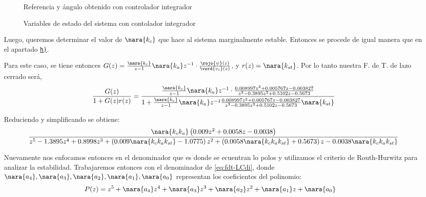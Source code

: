 \begin{figure}[h]
    \centering
    
    \caption{Referencia y ángulo obtenido con controlador integrador}\label{fig:psi-int-disc}
\end{figure}

\begin{figure}[h]
  \centering
  
  \caption{Variables de estado del sistema con contolador integrador}\label{fig:estado-int-disc}
\end{figure}

\FloatBarrier

Luego, queremos determinar el valor de $\nara{k_{c}}$ que hace al sistema
marginalmente estable. Entonces se procede de igual manera que en el apartado
\hyperref[pregunta-h]{\texttt{h)}}.

Para este caso, se tiene entonces
$G(z) = \frac{\nara{k_{c}}}{z-1}\nara{k_{a}} z^{-1} \cdot \frac{\rojo{\psi}(z)}{\verd{v_i}(z)}$,
y $r(z) = \nara{k_{st}}$. Por lo tanto nuestra F. de T. de lazo cerrado será,
\begin{equation}
    \frac{G(z)}{1 + G(z)r(z)} = \dfrac{\frac{\nara{k_{c}}}{z-1}\nara{k_a} z^{-1} \cdot\frac{0.008997z^2 + 0.005767 z - 0.003827}
    {z^3 - 0.3895 z^2 + 0.5102 z -0.5673}}
    {1+\frac{\nara{k_{c}}}{z-1}\nara{k_a} z^{-1} \frac{0.008997z^2 + 0.005767 z - 0.003827}
    {z^3 - 0.3895 z^2 + 0.5102 z -0.5673}\nara{k_{st}}}
\end{equation}

Reduciendo y simplificando se obtiene:
\begin{equation}\label{eq:fdt-LCdi}
    \frac{ \nara{k_c k_a} \left( 0.009 z^2 + 0.0058 z - 0.0038 \right)}
    { z^5 -1.3895z^4 + 0.8998z^3 + \left( 0.009\nara{k_c k_a k_{st}}  -1.0775 \right) z^2 
    + \left(0.0058 \nara{k_c k_a k_{st}}   + 0.5673 \right) z 
    -0.0038 \nara{k_c k_a k_{st}} }
\end{equation}

Nuevamente nos enfocamos entonces en el denominador que es donde se ecuentran lo polos y
utilizamos el criterio de Routh-Hurwitz para analizar la estabilidad. 
Trabajaremos entonces con el denominador de \eqref{eq:fdt-LCdi}, donde $\nara{a_4},\nara{a_3},\nara{a_2},\nara{a_1},\nara{a_0}$
representan los coeficientes del polinomio:
\begin{align}
    P(z) = z^5+ \nara{a_4}z^4 +\nara{a_3}z^3 + \nara{a_2} z^2 + \nara{a_1} z + \nara{a_0} &
\end{align}

